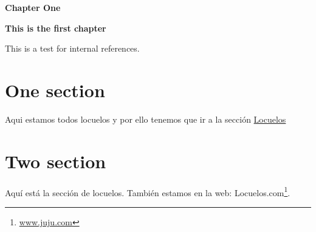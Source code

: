 \documentclass[
  10pt,
  a4paper,
  onecolumn,
  twoside]{article}
\author{}
\date{\vspace{-2.5em}}
\DeclareRobustCommand{\href}[2]{#2\footnote{\url{#1}}}
\begin{document}

\renewcommand{\maketitle}{
  \thispagestyle{firstpage}  
    \Huge
    \textbf{Chapter One}
    \par
    \vspace{1cm}
    \large
    \textbf{This is the first chapter}
    \par
    \vspace{3\parskip}
}

\newpage

  \thispagestyle{firstpage}  
    \Huge
    \textbf{Chapter One}
    \par
    \vspace{1cm}
    \large
    \textbf{This is the first chapter}
    \par
    \vspace{3\parskip}


\pagestyle{fancy}

This is a test for internal references.

\hypertarget{one-section}{%
\section{One section}\label{one-section}}

Aqui estamos todos locuelos y por ello tenemos que ir a la sección
\protect\hyperlink{two-section}{Locuelos}

\lipsum[1-18]

\hypertarget{two-section}{%
\section{Two section}\label{two-section}}

Aquí está la sección de locuelos. También estamos en la web:
\href{www.juju.com}{Locuelos.com}.
\end{document}
